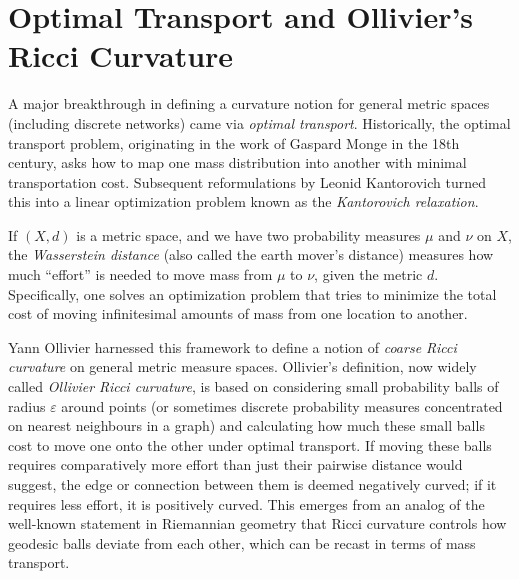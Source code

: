 \section{Optimal Transport and Ollivier's Ricci Curvature}
A major breakthrough in defining a curvature notion for general metric spaces (including discrete networks) came via \emph{optimal transport}. Historically, the optimal transport problem, originating in the work of Gaspard Monge in the 18th century, asks how to map one mass distribution into another with minimal transportation cost. Subsequent reformulations by Leonid Kantorovich turned this into a linear optimization problem known as the \emph{Kantorovich relaxation}. 

If $(X, d)$ is a metric space, and we have two probability measures $\mu$ and $\nu$ on $X$, the \emph{Wasserstein distance} (also called the earth mover's distance) measures how much ``effort'' is needed to move mass from $\mu$ to $\nu$, given the metric $d$. Specifically, one solves an optimization problem that tries to minimize the total cost of moving infinitesimal amounts of mass from one location to another. 

Yann Ollivier harnessed this framework to define a notion of \emph{coarse Ricci curvature} on general metric measure spaces. Ollivier's definition, now widely called \emph{Ollivier Ricci curvature}, is based on considering small probability balls of radius $\varepsilon$ around points (or sometimes discrete probability measures concentrated on nearest neighbours in a graph) and calculating how much these small balls cost to move one onto the other under optimal transport. If moving these balls requires comparatively more effort than just their pairwise distance would suggest, the edge or connection between them is deemed negatively curved; if it requires less effort, it is positively curved. This emerges from an analog of the well-known statement in Riemannian geometry that Ricci curvature controls how geodesic balls deviate from each other, which can be recast in terms of mass transport.
